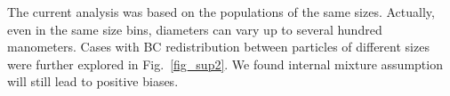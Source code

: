 \documentclass[edeposit,fullpage]{uiucthesis2009}
\makeatletter
\DeclareRobustCommand*\unit[1]
 {\ensuremath{%
   {\thinmuskip3mu\relax
    \def\mu{\text{\textmu}}\def~{\,}%
    \ifx\f@series\testbx\mathbf{#1}\else\mathrm{#1}\fi}}}
\makeatother
\begin{document}
The current analysis was based on the populations of the same sizes. Actually, even in the
same size bins, diameters can vary up to several hundred manometers. Cases with 
BC redistribution between particles of different sizes were further explored in  
Fig.~\ref{fig_sup2}. We found internal mixture assumption will still lead to positive biases. 

  


\end{document}
